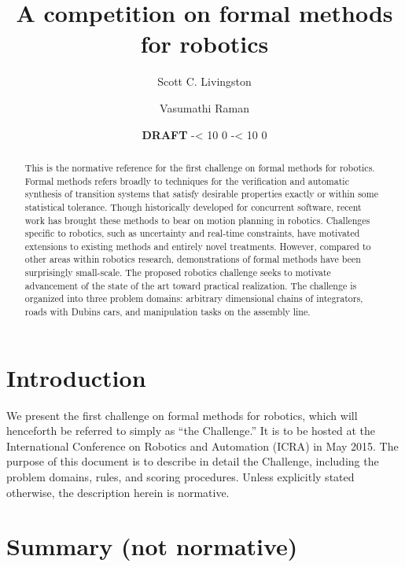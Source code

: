 \documentclass{amsart}
\theoremstyle{definition}
\def\now{\number\year%
-{\ifnum \month < 10 0\fi}\number\month%
-{\ifnum \day < 10 0\fi}\number\day}
\begin{document}
\title{A competition on formal methods for robotics}
\author{Scott C. Livingston}
\author{Vasumathi Raman}
\date{\textbf{DRAFT} \now}
\begin{abstract}
This is the normative reference for the first challenge on formal methods for
robotics.  Formal methods refers broadly to techniques for the verification and
automatic synthesis of transition systems that satisfy desirable properties
exactly or within some statistical tolerance.  Though historically developed for
concurrent software, recent work has brought these methods to bear on motion
planning in robotics.  Challenges specific to robotics, such as uncertainty and
real-time constraints, have motivated extensions to existing methods and
entirely novel treatments.  However, compared to other areas within robotics
research, demonstrations of formal methods have been surprisingly small-scale.
The proposed robotics challenge seeks to motivate advancement of the state of
the art toward practical realization.  The challenge is organized into three
problem domains: arbitrary dimensional chains of integrators, roads with Dubins
cars, and manipulation tasks on the assembly line.
\end{abstract}
\maketitle


\section{Introduction}

We present the first challenge on formal methods for robotics, which will
henceforth be referred to simply as ``the Challenge.''  It is to be hosted at
the International Conference on Robotics and Automation ({ICRA}) in May 2015.
The purpose of this document is to describe in detail the Challenge, including
the problem domains, rules, and scoring procedures.  Unless explicitly stated
otherwise, the description herein is normative.

\section{Summary (not normative)}
\end{document}
